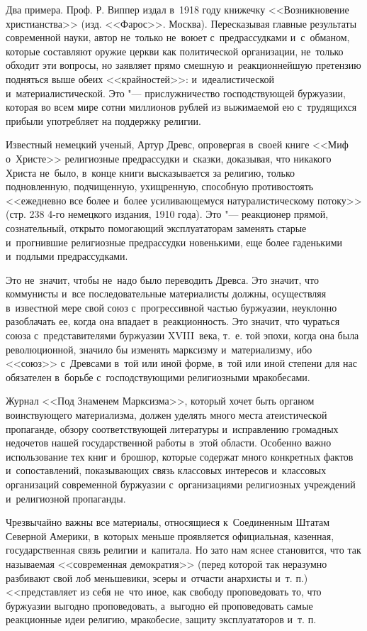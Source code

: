Два примера. Проф. Р. Виппер издал в~1918 году книжечку <<Возникновение христианства>> (изд. <<Фарос>>. Москва). Пересказывая главные результаты современной науки, автор не~только не~воюет с~предрассудками и~с~обманом, которые составляют оружие церкви как политической организации, не~только обходит эти вопросы, но заявляет прямо смешную и~реакционнейшую претензию подняться выше обеих <<крайностей>>: и~идеалистической и~материалистической. Это "--- прислужничество господствующей буржуазии, которая во всем мире сотни миллионов рублей из выжимаемой ею с~трудящихся прибыли употребляет на поддержку религии.

Известный немецкий ученый, Артур Древс, опровергая в~своей книге <<Миф о~Христе>> религиозные предрассудки и~сказки, доказывая, что никакого Христа не~было, в~конце книги высказывается за религию, только подновленную, подчищенную, ухищренную, способную противостоять <<ежедневно все более и~более усиливающемуся натуралистическому потоку>> (стр. 238 4-го немецкого издания, 1910 года). Это "--- реакционер прямой, сознательный, открыто помогающий эксплуататорам заменять старые и~прогнившие религиозные предрассудки новенькими, еще более гаденькими и~подлыми предрассудками.

Это не~значит, чтобы не~надо было переводить Древса. Это значит, что коммунисты и~все последовательные материалисты должны, осуществляя в~известной мере свой союз с~прогрессивной частью буржуазии, неуклонно разоблачать ее, когда она впадает в~реакционность. Это значит, что чураться союза с~представителями буржуазии XVIII~века, т.~е. той эпохи, когда она была революционной, значило бы изменять марксизму и~материализму, ибо <<союз>> с~Древсами в~той или иной форме, в~той или иной степени для нас обязателен в~борьбе с~господствующими религиозными мракобесами.

Журнал <<Под Знаменем Марксизма>>, который хочет быть органом воинствующего материализма, должен уделять много места атеистической пропаганде, обзору соответствующей литературы и~исправлению громадных недочетов нашей государственной работы в~этой области. Особенно важно использование тех книг и~брошюр, которые содержат много конкретных фактов и~сопоставлений, показывающих связь классовых интересов и~классовых организаций современной буржуазии с~организациями религиозных учреждений и~религиозной пропаганды.

Чрезвычайно важны все материалы, относящиеся к~Соединенным Штатам Северной Америки, в~которых меньше проявляется официальная, казенная, государственная связь религии и~капитала. Но зато нам яснее становится, что так называемая <<современная демократия>> (перед которой так неразумно разбивают свой лоб меньшевики, эсеры и~отчасти анархисты и~т. п.) <<представляет из себя не~что иное, как свободу проповедовать то, что буржуазии выгодно проповедовать, а~выгодно ей проповедовать самые реакционные идеи религию, мракобесие, защиту эксплуататоров и~т. п.

